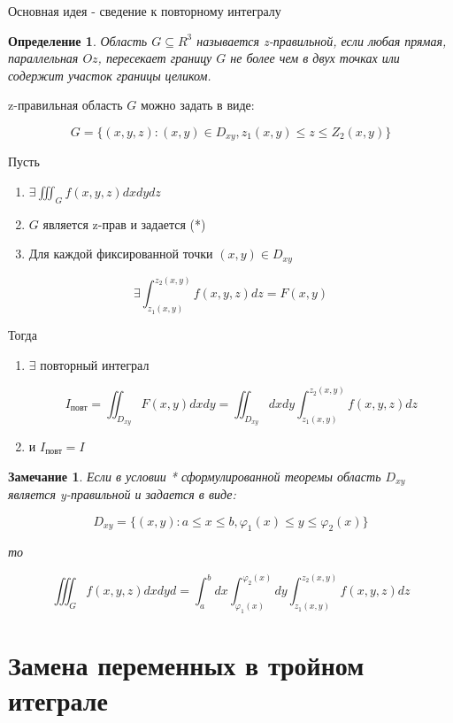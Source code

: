 \documentclass[a4paper, 14pt]{report}
\newtheorem{defenition}{Определение}[chapter]
\newtheorem{note}{Замечание}[chapter]
\begin{document}
Основная идея - сведение к повторному интегралу

\begin{defenition}
    Область $G \subseteq R^3$ называется z-правильной, если любая прямая, параллельная $Oz$, пересекает границу $G$ не более чем в двух точках или содержит участок границы целиком.
\end{defenition}

z-правильная область $G$ можно задать в виде:

$$
G = \{ (x,y,z) : (x,y) \in D_{xy}, z_1(x,y) \le z \le Z_2(x,y) \}
$$

\begin{theorem}
    Пусть

    \begin{enumerate}
        \item $\exists \iiint_G f(x,y,z) dxdydz$
        \item $G$ является z-прав и задается (*)
        \item Для каждой фиксированной точки $(x,y) \in D_{xy}$
    \end{enumerate}

    $$
    \exists \int_{z_1(x,y)}^{z_2(x,y)} f(x,y,z) dz = F(x,y)
    $$

    Тогда 

    \begin{enumerate}
        \item $\exists$ повторный интеграл

            $$
            I_\text{повт} = \iint_{D_{xy}} F(x,y) dxdy = \iint_{D_{xy}} dxdy \int_{z_1(x,y)}^{z_2(x,y)} f(x,y,z) dz
            $$

        \item и $I_\text{повт} = I$
    \end{enumerate}
\end{theorem}

\begin{note}
    Если в условии * сформулированной теоремы область $D_{xy}$ является y-правильной и задается в виде:

    $$
    D_{xy} = \{ (x,y): a \le x \le b, \varphi_1(x) \le y \le \varphi_2(x) \}
    $$

    то

    $$
    \iiint_G f(x,y,z) dxdyd = \int_a^bdx \int_{\varphi_1(x)}^{\varphi_2(x)} dy \int_{z_1(x,y)}^{z_2(x,y)} f(x,y,z) dz
    $$
\end{note}

\section{Замена переменных в тройном итеграле}
\end{document}
